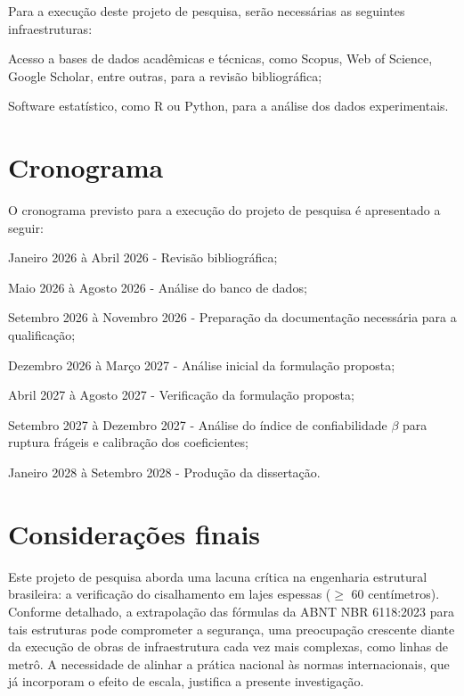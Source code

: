 Para a execução deste projeto de pesquisa, serão necessárias as seguintes infraestruturas:
\begin{alineas}
	\item Acesso a bases de dados acadêmicas e técnicas, como Scopus, Web of Science, Google Scholar, entre outras, para a revisão bibliográfica;
	\item Software estatístico, como R ou Python, para a análise dos dados experimentais.
\end{alineas}


\chapter{Cronograma}

O cronograma previsto para a execução do projeto de pesquisa é apresentado a seguir:

\begin{alineas}
    \item Janeiro 2026 à Abril 2026 - Revisão bibliográfica;
    \item Maio 2026 à Agosto 2026 - Análise do banco de dados;
    \item Setembro 2026 à Novembro 2026 - Preparação da documentação necessária para a qualificação;
    \item Dezembro 2026 à Março 2027 - Análise inicial da formulação proposta;
    \item Abril 2027 à Agosto 2027 - Verificação da formulação proposta;
    \item Setembro 2027 à Dezembro 2027 - Análise do índice de confiabilidade $\beta$ para ruptura frágeis e calibração dos coeficientes;
    \item Janeiro 2028 à Setembro 2028 - Produção da dissertação.
\end{alineas}








\chapter[Considerações finais]{Considerações finais}
Este projeto de pesquisa aborda uma lacuna crítica na engenharia estrutural brasileira: a verificação do cisalhamento em lajes espessas ($\geq$ 60 centímetros). Conforme detalhado, a extrapolação das fórmulas da ABNT NBR 6118:2023 para tais estruturas pode comprometer a segurança, uma preocupação crescente diante da execução de obras de infraestrutura cada vez mais complexas, como linhas de metrô. A necessidade de alinhar a prática nacional às normas internacionais, que já incorporam o efeito de escala, justifica a presente investigação.


